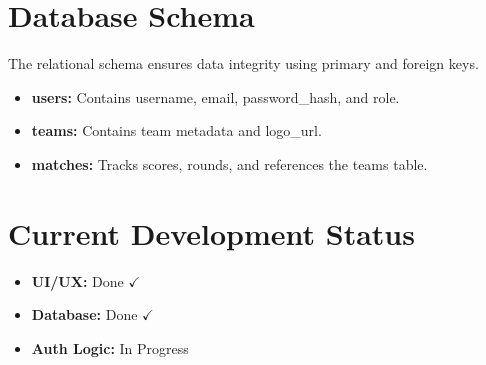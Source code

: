 \documentclass[12pt]{article}
\begin{document}
\section{Database Schema}
The relational schema ensures data integrity using primary and foreign keys.
\begin{itemize}
    \item \textbf{users:} Contains username, email, password\_hash, and role.
    \item \textbf{teams:} Contains team metadata and logo\_url.
    \item \textbf{matches:} Tracks scores, rounds, and references the teams table.
\end{itemize}

\section{Current Development Status}
\begin{itemize}
    \item \textbf{UI/UX:} Done $\checkmark$
    \item \textbf{Database:} Done $\checkmark$
    \item \textbf{Auth Logic:} In Progress
\end{itemize}
\end{document}

